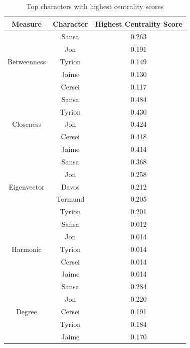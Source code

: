 \documentclass[10pt,twocolumn,letterpaper]{article}
\begin{document}
\begin{table}[!h]
    \centering
    \small
    \begin{tabular}{c|c|c}
        Measure & Character & \small{Highest Centrality Score} \\
        \hline
                    & Sansa & 0.263 \\
                    & Jon & 0.191 \\
        Betweenness & Tyrion & 0.149 \\
                    & Jaime & 0.130 \\
                    & Cersei & 0.117 \\
        \hline 
                    & Sansa & 0.484 \\
                    & Tyrion & 0.430 \\
        Closeness   & Jon & 0.424 \\
                    & Cersei & 0.418 \\
                    & Jaime & 0.414 \\
        \hline 
                    & Sansa & 0.368 \\
                    & Jon & 0.258 \\
        Eigenvector & Davos & 0.212 \\
                    & Tormund & 0.205 \\
                    & Tyrion & 0.201 \\
        \hline 
                    & Sansa & 0.012 \\
                    & Jon & 0.014 \\
        Harmonic    & Tyrion & 0.014 \\
                    & Cersei & 0.014 \\
                    & Jaime & 0.014 \\
        \hline
                    & Sansa & 0.284 \\
                    & Jon & 0.220 \\
        Degree      & Cersei & 0.191 \\
                    & Tyrion & 0.184 \\
                    & Jaime & 0.170 \\
        \hline
    \end{tabular}
    \vspace{0.2cm}
    \caption{Top characters with highest centrality scores}
    \label{tab:my_label}
\end{table}
\end{document}
